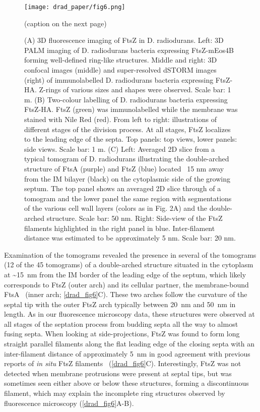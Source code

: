 \begin{figure}[ht]
    \centering
    \texttt{[image: drad\_paper/fig6.png]}
    \caption[Localisation of the key cell division factor, FtsZ, in D. radiodurans]{(caption on the next page)}
    \label{drad_fig6}
\end{figure}
\begin{figure}[ht]
    \ContinuedFloat
    \caption{(A) 3D fluorescence imaging of FtsZ in D. radiodurans. Left: 3D PALM imaging of D. radiodurans bacteria expressing FtsZ-mEos4B forming well-defined ring-like structures. Middle and right: 3D confocal images (middle) and super-resolved dSTORM images (right) of immunolabelled D. radiodurans bacteria expressing FtsZ-HA. Z-rings of various sizes and shapes were observed. Scale bar: 1 \mu{}m. (B) Two-colour labelling of D. radiodurans bacteria expressing FtsZ-HA. FtsZ (green) was immunolabelled while the membrane was stained with Nile Red (red). From left to right: illustrations of different stages of the division process. At all stages, FtsZ localizes to the leading edge of the septa. Top panels: top views, lower panels: side views. Scale bar: 1 \mu{}m. (C) Left: Averaged 2D slice from a typical tomogram of D. radiodurans illustrating the double-arched structure of FtsA (purple) and FtsZ (blue) located ~15 nm away from the IM bilayer (black) on the cytoplasmic side of the growing septum. The top panel shows an averaged 2D slice through of a tomogram and the lower panel the same region with segmentations of the various cell wall layers (colors as in Fig. 2A) and the double-arched structure. Scale bar: 50 nm. Right: Side-view of the FtsZ filaments highlighted in the right panel in blue. Inter-filament distance was estimated to be approximately 5 nm. Scale bar: 20 nm.}
\end{figure}

Examination of the tomograms revealed the presence in several of the tomograms (12 of the 45 tomograms) of a double-arched structure situated in the cytoplasm at \sim\qty{15}{nm} from the IM border of the leading edge of the septum, which likely corresponds to FtsZ (outer arch) and its cellular partner, the membrane-bound FtsA~\cite{sextonSuperresolutionConfocalCryoCLEM2022} (inner arch; \autoref{drad_fig6}C).
These two arches follow the curvature of the septal tip with the outer FtsZ arch typically between \qty{20}{nm} and \qty{50}{nm} in length.
As in our fluorescence microscopy data, these structures were observed at all stages of the septation process from budding septa all the way to almost fusing septa.
When looking at side-projections, FtsZ was found to form long straight parallel filaments along the flat leading edge of the closing septa with an inter-filament distance of approximately \qty{5}{nm} in good agreement with previous reports of \textit{in situ} FtsZ filaments~\cite{liStructureFtsZFilaments2007,szwedziakArchitectureRingFormed2014} (\autoref{drad_fig6}C).
Interestingly, FtsZ was not detected when membrane protrusions were present at septal tips, but was sometimes seen either above or below these structures, forming a discontinuous filament, which may explain the incomplete ring structures observed by fluorescence microscopy (\autoref{drad_fig6}A-B).

